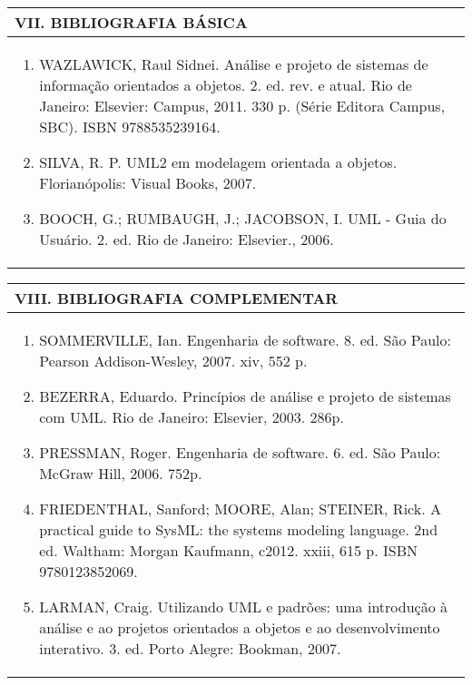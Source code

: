 \documentclass[12pt]{article}
\begin{document}
\newpage

\begin{longtable}{|L{1.025\textwidth}|} \hline
%
{\bf VII. BIBLIOGRAFIA BÁSICA} \\ \hline
\begin{enumerate}
%
\item WAZLAWICK, Raul Sidnei. Análise e projeto de sistemas de informação orientados a objetos. 2. ed. rev. e atual. Rio de Janeiro: Elsevier: Campus, 2011. 330 p. (Série Editora Campus, SBC). ISBN 9788535239164. 
\item SILVA, R. P. UML2 em modelagem orientada a objetos. Florianópolis: Visual Books, 2007.
\item BOOCH, G.; RUMBAUGH, J.; JACOBSON, I. UML - Guia do Usuário. 2. ed. Rio de Janeiro: Elsevier., 2006. 
\end{enumerate}
 \\ \hline
\end{longtable}



\begin{longtable}{|L{1.025\textwidth}|} \hline
%
{\bf VIII. BIBLIOGRAFIA COMPLEMENTAR} \\ \hline
\begin{enumerate}
\item SOMMERVILLE, Ian. Engenharia de software. 8. ed. São Paulo: Pearson Addison-Wesley, 2007. xiv, 552 p.
\item BEZERRA, Eduardo. Princípios de análise e projeto de sistemas com UML. Rio de Janeiro: Elsevier, 2003. 286p. 
\item PRESSMAN, Roger. Engenharia de software. 6. ed. São Paulo: McGraw Hill, 2006. 752p. 
\item FRIEDENTHAL, Sanford; MOORE, Alan; STEINER, Rick. A practical guide to SysML: the systems modeling language. 2nd ed. Waltham: Morgan Kaufmann, c2012. xxiii, 615 p. ISBN 9780123852069. 
\item LARMAN, Craig. Utilizando UML e padrões: uma introdução à análise e ao projetos orientados a objetos e ao desenvolvimento interativo. 3. ed. Porto Alegre: Bookman, 2007.

%
\end{enumerate}
 \\ \hline
\end{longtable}



\end{document}
